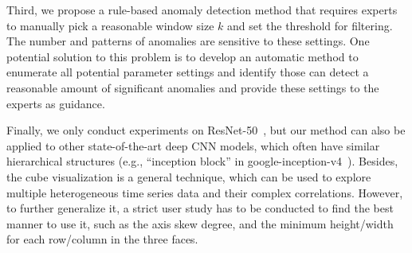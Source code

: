 \documentclass[format=acmsmall, review=false, screen=true]{acmart}
\begin{document}
Third, we propose a rule-based anomaly detection method that requires experts to manually pick a reasonable window size $k$ and set the threshold for filtering. The number and patterns of anomalies are sensitive to these settings. One potential solution to this problem is to develop an automatic method to enumerate all potential parameter settings and identify those can detect a reasonable amount of significant anomalies and provide these settings to the experts as guidance.

Finally, we only conduct experiments on ResNet-50~\cite{he2016deep}, but our method can also be applied to other state-of-the-art deep CNN models, which often have similar hierarchical structures (e.g., ``inception block'' in google-inception-v4~\cite{szegedy2016inception}).
Besides, the cube visualization is a general technique, which can be used to explore multiple heterogeneous time series data and their complex correlations.
However, to further generalize it, a strict user study has to be conducted to find the best manner to use it, such as the axis skew degree, and the minimum height/width for each row/column in the three faces.
\end{document}
